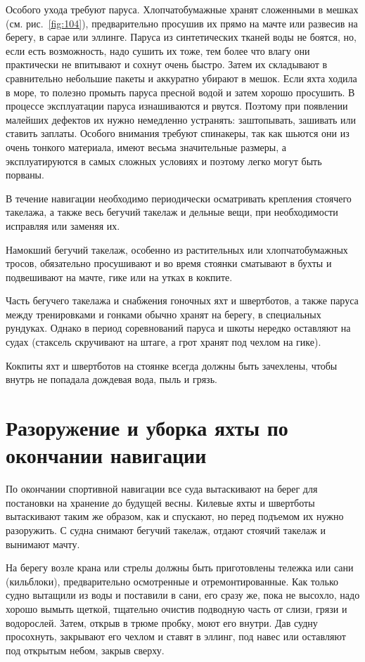 \documentclass[a4paper, 12pt, twoside, final]{scrbook}
\begin{document}
Особого ухода требуют паруса. Хлопчатобумажные хранят сложенными в мешках (см. рис.~\ref{fig:104}), предварительно просушив их прямо на мачте или развесив на берегу, в сарае или эллинге. Паруса из синтетических тканей воды не боятся, но, если есть возможность, надо сушить их тоже, тем более что влагу они практически не впитывают и сохнут очень быстро. Затем их складывают в сравнительно небольшие пакеты и аккуратно убирают в мешок. Если яхта ходила в море, то полезно промыть паруса пресной водой и затем хорошо просушить. В процессе эксплуатации паруса изнашиваются и рвутся. Поэтому при появлении малейших дефектов их нужно немедленно устранять: заштопывать, зашивать или ставить заплаты. Особого внимания требуют спинакеры, так как шьются они из очень тонкого материала, имеют весьма значительные размеры, а эксплуатируются в самых сложных условиях и поэтому легко могут быть порваны. 

В течение навигации необходимо периодически осматривать крепления стоячего такелажа, а также весь бегучий такелаж и дельные вещи, при необходимости исправляя или заменяя их. 

Намокший бегучий такелаж, особенно из растительных или хлопчатобумажных тросов, обязательно просушивают и во время стоянки сматывают в бухты и подвешивают на мачте, гике или на утках в кокпите. 

Часть бегучего такелажа и снабжения гоночных яхт и швертботов, а также паруса между тренировками и гонками обычно хранят на берегу, в специальных рундуках. Однако в период соревнований паруса и шкоты нередко оставляют на судах (стаксель скручивают на штаге, а грот хранят под чехлом на гике). 

Кокпиты яхт и швертботов на стоянке всегда должны быть зачехлены, чтобы внутрь не попадала дождевая вода, пыль и грязь. 

\section{Разоружение и уборка яхты по окончании навигации}

По окончании спортивной навигации все суда вытаскивают на берег для постановки на хранение до будущей весны. Килевые яхты и швертботы вытаскивают таким же образом, как и спускают, но перед подъемом их нужно разоружить. С судна снимают бегучий такелаж, отдают стоячий такелаж и вынимают мачту. 

На берегу возле крана или стрелы должны быть приготовлены тележка или сани (кильблоки), предварительно осмотренные и отремонтированные. Как только судно вытащили из воды и поставили в сани, его сразу же, пока не высохло, надо хорошо вымыть щеткой, тщательно очистив подводную часть от слизи, грязи и водорослей. Затем, открыв в трюме пробку, моют его внутри. Дав судну просохнуть, закрывают его чехлом и ставят в эллинг, под навес или оставляют под открытым небом, закрыв сверху. 
\end{document}
